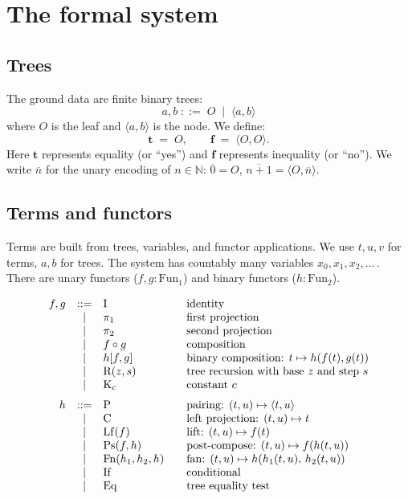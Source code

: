 \documentclass[11pt]{article}
\newcommand{\pair}[2]{\langle #1, #2 \rangle}
\newcommand{\true}{\mathbf{t}}
\newcommand{\false}{\mathbf{f}}
\newcommand{\nat}[1]{\overline{#1}}
\begin{document}
\section{The formal system}

\subsection*{Trees}

The ground data are finite binary trees:
\[
  a, b \;::=\; O \;\mid\; \pair{a}{b}
\]
where $O$ is the leaf and $\pair{a}{b}$ is the node.
We define:
\[
  \true \;=\; O, \qquad \false \;=\; \pair{O}{O}.
\]
Here $\true$ represents equality (or ``yes'') and $\false$
represents inequality (or ``no'').
We write $\nat{n}$ for the unary encoding of $n \in \mathbb{N}$:
$\nat{0} = O$, $\nat{n+1} = \pair{O}{\nat{n}}$.

\subsection*{Terms and functors}

Terms are built from trees, variables, and functor applications.
We use $t, u, v$ for terms, $a, b$ for trees.
The system has countably many variables $x_0, x_1, x_2, \ldots$\,.
There are unary functors ($f, g : \mathrm{Fun}_1$) and binary
functors ($h : \mathrm{Fun}_2$).

\[
\begin{array}{rcl@{\qquad}l}
  f, g &::=& \mathrm{I} & \text{identity} \\
       &\mid& \pi_1 & \text{first projection} \\
       &\mid& \pi_2 & \text{second projection} \\
       &\mid& f \circ g & \text{composition} \\
       &\mid& h[f, g] & \text{binary composition: } t \mapsto h(f(t), g(t)) \\
       &\mid& \mathrm{R}(z, s) & \text{tree recursion with base } z \text{ and step } s \\
       &\mid& \mathrm{K}_c & \text{constant } c \\[6pt]
  h &::=& \mathrm{P} & \text{pairing: } (t, u) \mapsto \pair{t}{u} \\
    &\mid& \mathrm{C} & \text{left projection: } (t, u) \mapsto t \\
    &\mid& \mathrm{Lf}(f) & \text{lift: } (t, u) \mapsto f(t) \\
    &\mid& \mathrm{Ps}(f, h) & \text{post-compose: } (t, u) \mapsto f(h(t, u)) \\
    &\mid& \mathrm{Fn}(h_1, h_2, h) & \text{fan: } (t, u) \mapsto h(h_1(t,u),\, h_2(t,u)) \\
    &\mid& \mathrm{If} & \text{conditional} \\
    &\mid& \mathrm{Eq} & \text{tree equality test}
\end{array}
\]
\end{document}
